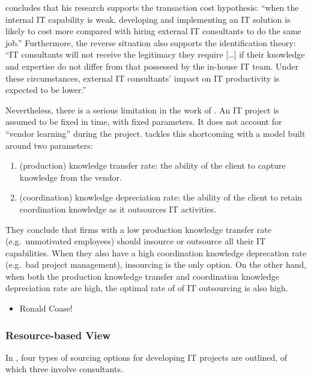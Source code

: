\documentclass[12pt]{article}
\providecommand{\tightlist}{%
  \setlength{\itemsep}{0pt}\setlength{\parskip}{0pt}}
\begin{document}
\citet[16-17]{nevo2007} concludes that his research supports the
transaction cost hypothesis: ``when the internal IT capability is weak,
developing and implementing an IT solution is likely to cost more
compared with hiring external IT consultants to do the same job.''
Furthermore, the reverse situation also supports the identification
theory: ``IT consultants will not receive the legitimacy they require
{[}\ldots{]} if their knowledge and expertise do not differ from that
possessed by the in-house IT team. Under these circumstances, external
IT consultants' impact on IT productivity is expected to be lower.''

Nevertheless, there is a serious limitation in the work of
\citet{nevo2007}. An IT project is assumed to be fixed in time, with
fixed parameters. It does not account for ``vendor learning''
\citep{wu2004} during the project. \citet{cha2009} tackles this
shortcoming with a model built around two parameters:

\begin{enumerate}
\def\labelenumi{\arabic{enumi}.}
\tightlist
\item
  (production) knowledge transfer rate: the ability of the client to
  capture knowledge from the vendor.
\item
  (coordination) knowledge depreciation rate: the ability of the client
  to retain coordination knowledge as it outsources IT activities.
\end{enumerate}

They conclude that firms with a low production knowledge transfer rate
(e.g.~unmotivated employees) should insource or outsource all their IT
capabilities. When they also have a high coordination knowledge
deprecation rate (e.g.~bad project management), insourcing is the only
option. On the other hand, when both the production knowledge transfer
and coordination knowledge depreciation rate are high, the optimal rate
of of IT outsourcing is also high.

\begin{itemize}
\tightlist
\item
  Ronald Coase!
\end{itemize}

\hypertarget{resource-based-view}{%
\subsubsection{Resource-based View}\label{resource-based-view}}

In \citet[177-180]{willcocks2003}, four types of sourcing options for
developing IT projects are outlined, of which three involve consultants.
\end{document}
